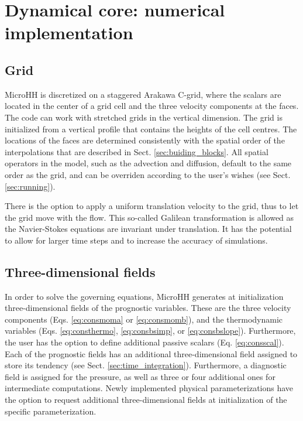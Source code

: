 \documentclass[gmd,manuscript]{copernicus}
\begin{document}
\section{Dynamical core: numerical implementation}\label{sec:dyncorediscrete}
\subsection{Grid}\label{sec:grid}
MicroHH is discretized on a staggered Arakawa C-grid, where the scalars are located in the center of a grid cell and the three velocity components at the faces. The code can work with stretched grids in the vertical dimension. The grid is initialized from a vertical profile that contains the heights of the cell centres. The locations of the faces are determined consistently with the spatial order of the interpolations that are described in Sect. \ref{sec:buiding_blocks}. All spatial operators in the model, such as the advection and diffusion, default to the same order as the grid, and can be overriden according to the user's wishes (see Sect. \ref{sec:running}).

There is the option to apply a uniform translation velocity to the grid, thus to let the grid move with the flow. This so-called Galilean transformation is allowed as the Navier-Stokes equations are invariant under translation. It has the potential to allow for larger time steps and to increase the accuracy of simulations.

\subsection{Three-dimensional fields}
In order to solve the governing equations, MicroHH generates at initialization three-dimensional fields of the prognostic variables. These are the three velocity components (Eqs. \ref{eq:consmoma} or \ref{eq:consmomb}), and the thermodynamic variables (Eqs. \ref{eq:consthermo}, \ref{eq:consbsimp}, or \ref{eq:consbslope}). Furthermore, the user has the option to define additional passive scalars (Eq. \ref{eq:consscal}). Each of the prognostic fields has an additional three-dimensional field assigned to store its tendency (see Sect. \ref{sec:time_integration}). Furthermore, a diagnostic field is assigned for the pressure, as well as three or four additional ones for intermediate computations. Newly implemented physical parameterizations have the option to request additional three-dimensional fields at initialization of the specific parameterization.
\end{document}
